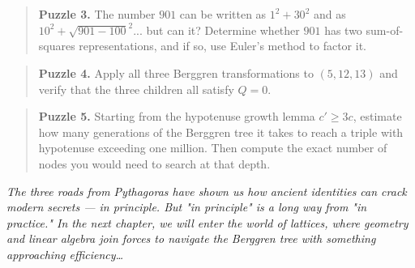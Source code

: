 \begin{quote}
\textbf{Puzzle 3.} The number $901$ can be written as $1^2 + 30^2$ and as $10^2 + \sqrt{901 - 100}^2$... but can it? Determine whether $901$ has two sum-of-squares representations, and if so, use Euler's method to factor it.
\end{quote}

\begin{quote}
\textbf{Puzzle 4.} Apply all three Berggren transformations to $(5, 12, 13)$ and verify that the three children all satisfy $Q = 0$.
\end{quote}

\begin{quote}
\textbf{Puzzle 5.} Starting from the hypotenuse growth lemma $c' \geq 3c$, estimate how many generations of the Berggren tree it takes to reach a triple with hypotenuse exceeding one million. Then compute the exact number of nodes you would need to search at that depth.
\end{quote}


\ornbreak


\textit{The three roads from Pythagoras have shown us how ancient identities can crack modern secrets --- in principle. But "in principle" is a long way from "in practice." In the next chapter, we will enter the world of lattices, where geometry and linear algebra join forces to navigate the Berggren tree with something approaching efficiency…}

